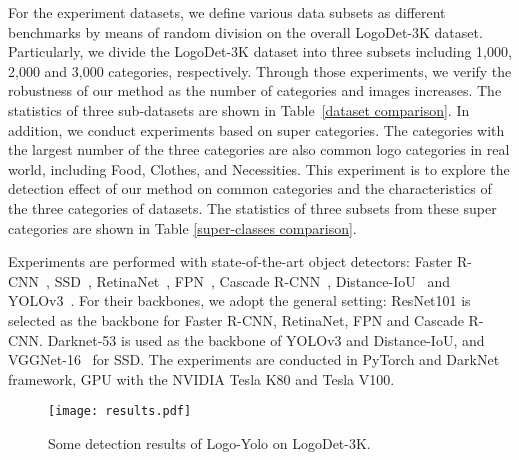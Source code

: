 \documentclass[journal]{IEEEtran}
\begin{document}
For the experiment datasets, we define various data subsets as different benchmarks by means of random division on the overall LogoDet-3K dataset. Particularly, we divide the LogoDet-3K dataset into three subsets including 1,000, 2,000 and 3,000 categories, respectively. Through those experiments, we verify the robustness of our method as the number of categories and images increases. The statistics of three sub-datasets are shown in Table~\ref{dataset comparison}. In addition, we conduct experiments based on super categories. The categories with the largest number of the three categories are also common logo categories in real world, including Food, Clothes, and Necessities. This experiment is to explore the detection effect of our method on common categories and the characteristics of the three categories of datasets. The statistics of three subsets from these super categories are shown in Table \ref{super-classes comparison}. 

Experiments are performed with state-of-the-art object detectors: Faster R-CNN~\cite{Ren2015}, SSD~\cite{liu2016ssd}, RetinaNet~\cite{Tsung2017Focal}, FPN~\cite{Lin2017FPN}, Cascade R-CNN~\cite{Cai2018CascadeR-CNN}, Distance-IoU~\cite{Zheng2020Distance} and YOLOv3~\cite{Joseph2018Yolov3}. For their backbones, we adopt the general setting: ResNet101 is selected as the backbone for Faster R-CNN, RetinaNet, FPN and Cascade R-CNN. Darknet-53 is used as the backbone of YOLOv3 and Distance-IoU, and VGGNet-16~\cite{VGG2015} for SSD. The experiments are conducted in PyTorch and DarkNet framework, GPU with the NVIDIA Tesla K80 and Tesla V100.
\begin{figure*}[!t]
	\centering
	\texttt{[image: results.pdf]}
	\caption{Some detection results of Logo-Yolo on LogoDet-3K.}
	\label{result}
\end{figure*}
\end{document}

